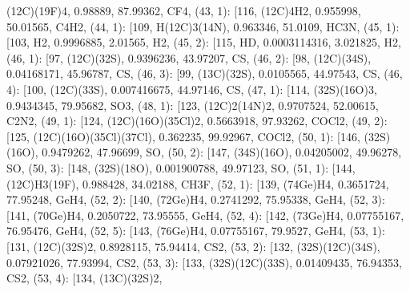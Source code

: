 \documentclass[letterpaper,10pt,english]{sphinxmanual}
\begin{document}
\begin{fulllineitems}
\textquotesingle{}(12C)(19F)4\textquotesingle{}, 0.98889, 87.99362, \textquotesingle{}CF4\textquotesingle{}{]}, (43, 1): {[}116, \textquotesingle{}(12C)4H2\textquotesingle{}, 0.955998, 50.01565, \textquotesingle{}C4H2\textquotesingle{}{]}, (44, 1): {[}109, \textquotesingle{}H(12C)3(14N)\textquotesingle{}, 0.963346, 51.0109, \textquotesingle{}HC3N\textquotesingle{}{]}, (45, 1): {[}103, \textquotesingle{}H2\textquotesingle{}, 0.9996885, 2.01565, \textquotesingle{}H2\textquotesingle{}{]}, (45, 2): {[}115, \textquotesingle{}HD\textquotesingle{}, 0.0003114316, 3.021825, \textquotesingle{}H2\textquotesingle{}{]}, (46, 1): {[}97, \textquotesingle{}(12C)(32S)\textquotesingle{}, 0.9396236, 43.97207, \textquotesingle{}CS\textquotesingle{}{]}, (46, 2): {[}98, \textquotesingle{}(12C)(34S)\textquotesingle{}, 0.04168171, 45.96787, \textquotesingle{}CS\textquotesingle{}{]}, (46, 3): {[}99, \textquotesingle{}(13C)(32S)\textquotesingle{}, 0.0105565, 44.97543, \textquotesingle{}CS\textquotesingle{}{]}, (46, 4): {[}100, \textquotesingle{}(12C)(33S)\textquotesingle{}, 0.007416675, 44.97146, \textquotesingle{}CS\textquotesingle{}{]}, (47, 1): {[}114, \textquotesingle{}(32S)(16O)3\textquotesingle{}, 0.9434345, 79.95682, \textquotesingle{}SO3\textquotesingle{}{]}, (48, 1): {[}123, \textquotesingle{}(12C)2(14N)2\textquotesingle{}, 0.9707524, 52.00615, \textquotesingle{}C2N2\textquotesingle{}{]}, (49, 1): {[}124, \textquotesingle{}(12C)(16O)(35Cl)2\textquotesingle{}, 0.5663918, 97.93262, \textquotesingle{}COCl2\textquotesingle{}{]}, (49, 2): {[}125, \textquotesingle{}(12C)(16O)(35Cl)(37Cl)\textquotesingle{}, 0.362235, 99.92967, \textquotesingle{}COCl2\textquotesingle{}{]}, (50, 1): {[}146, \textquotesingle{}(32S)(16O)\textquotesingle{}, 0.9479262, 47.96699, \textquotesingle{}SO\textquotesingle{}{]}, (50, 2): {[}147, \textquotesingle{}(34S)(16O)\textquotesingle{}, 0.04205002, 49.96278, \textquotesingle{}SO\textquotesingle{}{]}, (50, 3): {[}148, \textquotesingle{}(32S)(18O)\textquotesingle{}, 0.001900788, 49.97123, \textquotesingle{}SO\textquotesingle{}{]}, (51, 1): {[}144, \textquotesingle{}(12C)H3(19F)\textquotesingle{}, 0.988428, 34.02188, \textquotesingle{}CH3F\textquotesingle{}{]}, (52, 1): {[}139, \textquotesingle{}(74Ge)H4\textquotesingle{}, 0.3651724, 77.95248, \textquotesingle{}GeH4\textquotesingle{}{]}, (52, 2): {[}140, \textquotesingle{}(72Ge)H4\textquotesingle{}, 0.2741292, 75.95338, \textquotesingle{}GeH4\textquotesingle{}{]}, (52, 3): {[}141, \textquotesingle{}(70Ge)H4\textquotesingle{}, 0.2050722, 73.95555, \textquotesingle{}GeH4\textquotesingle{}{]}, (52, 4): {[}142, \textquotesingle{}(73Ge)H4\textquotesingle{}, 0.07755167, 76.95476, \textquotesingle{}GeH4\textquotesingle{}{]}, (52, 5): {[}143, \textquotesingle{}(76Ge)H4\textquotesingle{}, 0.07755167, 79.9527, \textquotesingle{}GeH4\textquotesingle{}{]}, (53, 1): {[}131, \textquotesingle{}(12C)(32S)2\textquotesingle{}, 0.8928115, 75.94414, \textquotesingle{}CS2\textquotesingle{}{]}, (53, 2): {[}132, \textquotesingle{}(32S)(12C)(34S)\textquotesingle{}, 0.07921026, 77.93994, \textquotesingle{}CS2\textquotesingle{}{]}, (53, 3): {[}133, \textquotesingle{}(32S)(12C)(33S)\textquotesingle{}, 0.01409435, 76.94353, \textquotesingle{}CS2\textquotesingle{}{]}, (53, 4): {[}134, \textquotesingle{}(13C)(32S)2\textquotesingle{}, 
\end{fulllineitems}
\end{document}
